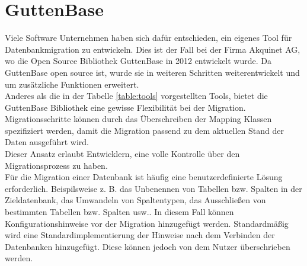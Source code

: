 \section{GuttenBase}
Viele Software Unternehmen haben sich dafür entschieden, ein eigenes Tool für Datenbankmigration zu entwickeln. Dies ist der Fall bei der Firma Akquinet AG, wo die Open Source Bibliothek GuttenBase in 2012 entwickelt wurde. Da GuttenBase open source ist, wurde sie in weiteren Schritten weiterentwickelt und um zusätzliche Funktionen erweitert.\\
Anderes als die in der Tabelle \ref{table:tools} vorgestellten Tools, bietet die GuttenBase Bibliothek eine gewisse Flexibilität bei der Migration. Migrationsschritte können durch das Überschreiben der Mapping Klassen spezifiziert werden, damit die Migration passend zu dem aktuellen Stand der Daten ausgeführt wird.\\
Dieser Ansatz erlaubt Entwicklern, eine volle Kontrolle über den Migrationsprozess zu haben.\\
Für die Migration einer Datenbank ist häufig eine benutzerdefinierte Lösung erforderlich. Beispilsweise z. B. das Unbenennen von Tabellen bzw. Spalten in der Zieldatenbank, das Umwandeln von Spaltentypen, das Ausschließen von bestimmten Tabellen bzw. Spalten usw..
In diesem Fall können Konfigurationshinweise vor der Migration hinzugefügt werden. Standardmäßig wird eine Standardimplementierung der Hinweise nach dem Verbinden der Datenbanken hinzugefügt. Diese können jedoch von dem Nutzer überschrieben werden. 




